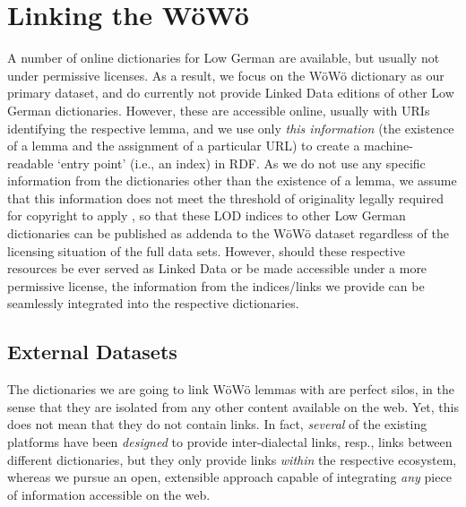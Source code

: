 \section{Linking the WöWö}

A number of online dictionaries for Low German are available, but usually not under permissive licenses. As a result, we focus on the WöWö dictionary as our primary dataset, and do currently not provide Linked Data editions of other Low German dictionaries. However, these are accessible online, usually with URIs identifying the respective lemma, and we use only \emph{this information} (the existence of a lemma and the assignment of a particular URL) to create a machine-readable `entry point' (i.e., an index) in RDF. As we do not use any specific information from the dictionaries other than the existence of a lemma, we assume that this information does not meet the threshold of originality legally required for copyright to apply \citet{Margoni2016},
so that these LOD indices to other Low German dictionaries can be published as addenda to the WöWö dataset regardless of the licensing situation of the full data sets. However, should these respective resources be ever served as Linked Data or be made accessible under a more permissive license, the information from the indices/links we provide can be seamlessly integrated into the respective dictionaries.

\subsection{External Datasets}

The dictionaries we are going to link WöWö lemmas with are perfect silos, in the sense that they are isolated from any other content available on the web. Yet, this does not mean that they do not contain links. In fact, \emph{several} of the existing platforms have been \emph{designed} to provide inter-dialectal links, resp., links between different dictionaries, but they only provide links \emph{within} the respective ecosystem, whereas we pursue an open, extensible approach capable of integrating \emph{any} piece of information accessible on the web. 

